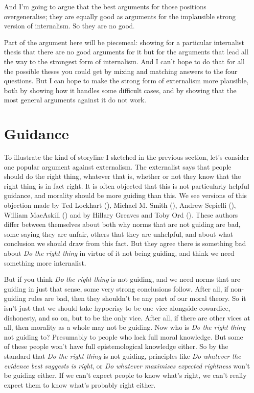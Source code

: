 \documentclass[
  10pt,
  letterpaper,
  twoside]{scrbook}
\begin{document}
And I'm going to argue that the best arguments for those positions
overgeneralise; they are equally good as arguments for the implausible
strong version of internalism. So they are no good.

Part of the argument here will be piecemeal: showing for a particular
internalist thesis that there are no good arguments for it but for the
arguments that lead all the way to the strongest form of internalism.
And I can't hope to do that for all the possible theses you could get by
mixing and matching answers to the four questions. But I can hope to
make the strong form of externalism more plausible, both by showing how
it handles some difficult cases, and by showing that the most general
arguments against it do not work.

\section{Guidance}\label{guidance}

To illustrate the kind of storyline I sketched in the previous section,
let's consider one popular argument against externalism. The externalist
says that people should do the right thing, whatever that is, whether or
not they know that the right thing is in fact right. It is often
objected that this is not particularly helpful guidance, and morality
should be more guiding than this. We see versions of this objection made
by Ted Lockhart (), Michael M.
Smith (), Andrew Sepielli
(), William MacAskill
() and by Hillary Greaves and
Toby Ord (). These authors differ
between themselves about both why norms that are not guiding are bad,
some saying they are unfair, others that they are unhelpful, and about
what conclusion we should draw from this fact. But they agree there is
something bad about \emph{Do the right thing} in virtue of it not being
guiding, and think we need something more internalist.

But if you think \emph{Do the right thing} is not guiding, and we need
norms that are guiding in just that sense, some very strong conclusions
follow. After all, if non-guiding rules are bad, then they shouldn't be
any part of our moral theory. So it isn't just that we should take
hypocrisy to be one vice alongside cowardice, dishonesty, and so on, but
to be the only vice. After all, if there are other vices at all, then
morality as a whole may not be guiding. Now who is \emph{Do the right
thing} not guiding to? Presumably to people who lack full moral
knowledge. But some of these people won't have full epistemological
knowledge either. So by the standard that \emph{Do the right thing} is
not guiding, principles like \emph{Do whatever the evidence best
suggests is right}, or \emph{Do whatever maximises expected rightness}
won't be guiding either. If we can't expect people to know what's right,
we can't really expect them to know what's probably right either.
\end{document}
